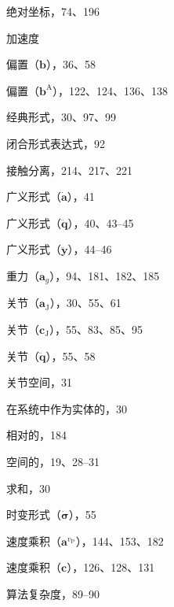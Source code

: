 \documentclass[10pt,a4paper]{book}
\theoremstyle{thmstyle} %
\theoremstyle{defstyle} %
\theoremstyle{prostyle} %
\begin{document}
绝对坐标，74、196



加速度



偏置（$\boldsymbol{b}$），36、58



偏置（$\boldsymbol{b}^{\mathrm{A}}$），122、124、136、138



经典形式，30、97、99



闭合形式表达式，92



接触分离，214、217、221



广义形式（$\dot{\boldsymbol{a}}$），41



广义形式（$\ddot{\boldsymbol{q}}$），40、43–45



广义形式（$\ddot{\boldsymbol{y}}$），44–46



重力（$\boldsymbol{a}_{g}$），94、181、182、185



关节（$\boldsymbol{a}_{\mathrm{J}}$），30、55、61



关节（$\boldsymbol{c}_{\mathrm{J}}$），55、83、85、95



关节（$\ddot{\boldsymbol{q}}$），55、58



关节空间，31



在系统中作为实体的，30



相对的，184



空间的，19、28–31



求和，30



时变形式（$\dot{\boldsymbol{\sigma}}$），55



速度乘积（$\boldsymbol{a}^{v_{\mathrm{P}}}$），144、153、182



速度乘积（$\boldsymbol{c}$），126、128、131



算法复杂度，89–90
\end{document}
